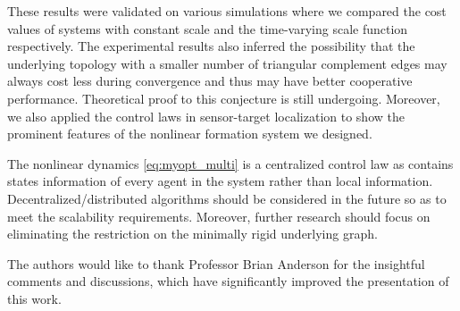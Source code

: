 \documentclass[times]{rncauth}
\begin{document}
These results were validated on various simulations where we
compared the cost values of  systems with constant scale and the
time-varying scale function respectively.  The experimental results
also inferred the possibility that the underlying topology with a
smaller number of triangular complement edges may always cost less
during convergence and thus may have better cooperative performance.
Theoretical proof to this conjecture is still undergoing. Moreover,
we also applied the control laws in sensor-target localization to
show the prominent features of the nonlinear formation system we
designed.

The nonlinear dynamics \eqref{eq:myopt_multi} is a centralized
control law as  contains states information
of every agent in the system rather than local information.
Decentralized/distributed algorithms should be considered in the
future so as to meet the scalability requirements. Moreover, further
research should focus on eliminating the restriction on the
minimally rigid underlying graph.

\ack The authors would like to thank Professor Brian Anderson for the insightful comments and discussions, which have significantly improved the presentation of this work.



\end{document}
